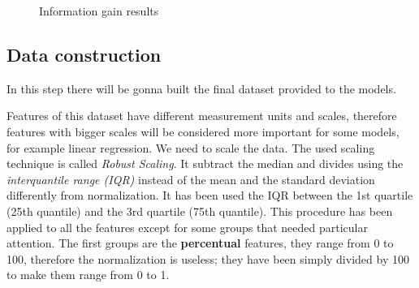 \begin{figure}[H]
    \label{fig:ig}
    \caption{Information gain results}
\end{figure}

\subsection{Data construction}

In this step there will be gonna built the final dataset provided to the models.

Features of this dataset have different measurement units and scales, therefore features with bigger scales will be considered more important for some models, for example linear regression. We need to scale the data.
The used scaling technique is called \textit{Robust Scaling}. It subtract the median and divides using the \textit{interquantile range (IQR)} instead of the mean and the standard deviation differently from normalization. It has been used the IQR between the 1st quartile (25th quantile) and the 3rd quartile (75th quantile).
This procedure has been applied to all the features except for some groups that needed particular attention.
The first groups are the \textbf{percentual} features, they range from 0 to 100, therefore the normalization is useless; they have been simply divided by 100 to make them range from 0 to 1. 

